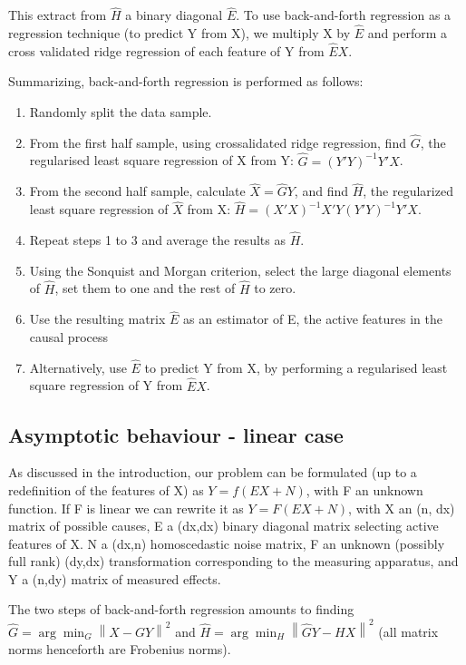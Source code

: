 \documentclass{article}
\begin{document}
This extract from $\hat H$ a binary diagonal $\hat E$.
%
To use back-and-forth regression as a regression technique (to predict Y from X), we multiply X by $\hat E$ and perform a cross validated ridge regression of each feature of Y from $\hat E X$.

Summarizing, back-and-forth regression is performed as follows:
\begin{enumerate}
\item Randomly split the data sample.
\item From the first half sample, using crossalidated ridge regression, find $\hat G$, the regularised least square regression of X from Y: $\hat G=(Y'Y)^{-1} Y'X$.
\item From the second half sample, calculate $\hat X = \hat G Y$, and find $\hat H$, the regularized least square regression of $\hat X$ from X: $\hat H=(X'X)^{-1} X'Y(Y'Y)^{-1} Y'X$.
\item Repeat steps 1 to 3 and average the results as $\hat H$.
\item Using the Sonquist and Morgan criterion, select the large diagonal elements of $\hat H$, set them to one and the rest of $\hat  H$ to zero.
\item Use the resulting matrix $\hat E$ as an estimator of E, the active features in the causal process
\item Alternatively, use $\hat E$ to predict Y from X, by performing a regularised least square regression of Y from $\hat E X$.
%

\end{enumerate}

\subsection{Asymptotic behaviour - linear case}
As discussed in the introduction, our problem can be formulated (up to a redefinition of the features of X) as $Y=f(EX+N)$, with F an unknown function.
%
If F is linear we can rewrite it as $Y = F(EX + N)$, with X an (n, dx) matrix of possible causes, E a (dx,dx) binary diagonal matrix selecting active features of X.
%
N a (dx,n) homoscedastic noise matrix, F an unknown (possibly full rank) (dy,dx) transformation corresponding to the measuring apparatus, and Y a (n,dy) matrix of measured effects.

The two steps of back-and-forth regression amounts to finding $\hat G=\arg \min_G \left \| X-GY \right \|^2$ and $\hat H =\arg \min_H \left \| \hat GY - HX \right \|^2$ (all matrix norms henceforth are Frobenius norms).
\end{document}
